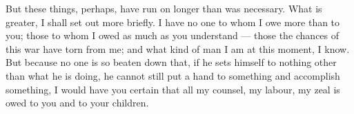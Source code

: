  But these things, perhaps, have run on longer than was necessary. What is greater, I shall set out more briefly. I have no one to whom I owe more than to you; those to whom I owed as much as you understand --- those the chances of this war have torn from me; and what kind of man I am at this moment, I know. But because no one is so beaten down that, if he sets himself to nothing other than what he is doing, he cannot still put a hand to something and accomplish something, I would have you certain that all my counsel, my labour, my zeal is owed to you and to your children.
